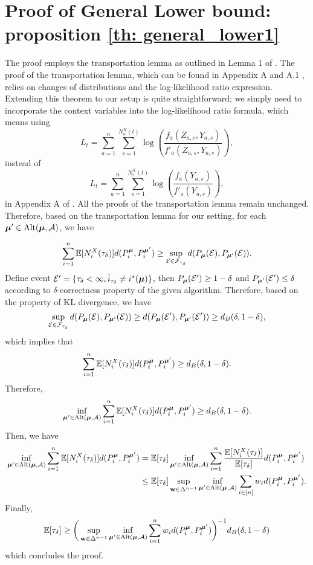 \section{Proof of General Lower bound: proposition \ref{th: general_lower1}} \label{apd: general bound}
    The proof employs the transportation lemma as outlined in Lemma 1 of \cite{kaufmann2016complexity}. The proof of the transportation lemma, which can be found in Appendix A and A.1 \cite{kaufmann2016complexity}, relies on changes of distributions and the log-likelihood ratio expression. Extending this theorem to our setup is quite straightforward; we simply need to incorporate the context variables into the log-likelihood ratio formula, which means using    
    $$
        L_t = \sum_{a = 1}^{n} \sum_{s = 1}^{N^{X}_a(t)} \log \left ( \frac{f_a(Z_{a,s}, Y_{a,s})}{f'_a(Z_{a,s}, Y_{a,s})} \right),
    $$
    instead of 
    $$
        L_t = \sum_{a = 1}^{n} \sum_{s = 1}^{N^{X}_i(t)} \log \left ( \frac{f_a(Y_{a,s})}{f'_a(Y_{a,s})} \right),
    $$
    in Appendix A of \cite{kaufmann2016complexity}. All the proofs of the transportation lemma remain unchanged. Therefore, based on the transportation lemma for our setting, for each $\boldsymbol{\mu}' \in \text{Alt}(\boldsymbol{\mu}, \mathcal{A})$, we have  

    $$
        \sum_{i = 1}^{n} \mathbb{E}[N^{X}_{i}(\tau_{\delta})] d(P^{\boldsymbol{\mu}}_{i}, P^{\boldsymbol{\mu}'}_{i}) \geq \sup_{\mathcal{E} \in \mathcal{F}_{\tau_{\delta}}} d (P_{\boldsymbol{\mu}}(\mathcal{E}), P_{\boldsymbol{\mu}'}(\mathcal{E})).
    $$
    Define event $\mathcal{E}' = \{\tau_{\delta} < \infty, \hat{i}_{\tau_{\delta}} \neq i^*(\boldsymbol{\mu})\}$, then $P_{\boldsymbol{\mu}}(\mathcal{E}') \geq 1 - \delta$ and  $P_{\boldsymbol{\mu}'}(\mathcal{E}') \leq \delta$ according to $\delta$-correctness property of the given algorithm. Therefore, based on the property of KL divergence, we have
    $$
        \sup_{\mathcal{E} \in \mathcal{F}_{\tau_{\delta}}} d (P_{\boldsymbol{\mu}}(\mathcal{E}), P_{\boldsymbol{\mu}'}(\mathcal{E})) \geq  d (P_{\boldsymbol{\mu}}(\mathcal{E}'), P_{\boldsymbol{\mu}'}(\mathcal{E}')) \geq d_{B} (\delta, 1 - \delta),
    $$
    which implies that
    $$
        \sum_{i = 1}^{n} \mathbb{E}[N^{X}_{i}(\tau_{\delta})] d(P^{\boldsymbol{\mu}}_{i}, P^{\boldsymbol{\mu}'}_{i}) \geq d_{B} (\delta, 1 - \delta).
    $$
    Therefore, 
    $$ 
       \inf_{\boldsymbol{\mu}' \in \text{Alt}(\boldsymbol{\mu}, \mathcal{A})} \sum_{i = 1}^{n} \mathbb{E}[N^{X}_{i}(\tau_{\delta})] d(P^{\boldsymbol{\mu}}_{i}, P^{\boldsymbol{\mu}'}_{i}) \geq d_{B} (\delta, 1 - \delta).
    $$
    Then, we have    
    \begin{align*}
        \inf_{\boldsymbol{\mu}' \in \text{Alt}(\boldsymbol{\mu}, \mathcal{A})} \sum_{i = 1}^{n} \mathbb{E}[N^{X}_{i}(\tau_{\delta})] d(P^{\boldsymbol{\mu}}_{i}, P^{\boldsymbol{\mu}'}_{i}) &= \mathbb{E}[\tau_{\delta}]  \inf_{\boldsymbol{\mu}' \in \text{Alt}(\boldsymbol{\mu}, \mathcal{A})} \sum_{i = 1}^{n} \frac{\mathbb{E}[N^{X}_{i}(\tau_{\delta})]}{\mathbb{E}[\tau_{\delta}]} d(P^{\boldsymbol{\mu}}_{i}, P^{\boldsymbol{\mu}'}_{i}) \\
              & \leq \mathbb{E}[\tau_{\delta}] \sup_{\mathbf{w} \in \Delta^{n-1}} \inf_{\boldsymbol{\mu}' \in \text{Alt}(\boldsymbol{\mu}, \mathcal{A})} \sum_{i \in [n]} w_i d(P^{\boldsymbol{\mu}}_{i}, P^{\boldsymbol{\mu}'}_{i}). 
    \end{align*}
    Finally,
    $$
        \mathbb{E}[\tau_{\delta}]    \geq \bigg ( \sup_{\mathbf{w} \in \Delta^{n-1}} \inf_{\boldsymbol{\mu}' \in \text{Alt}(\boldsymbol{\mu}, \mathcal{A})} \sum_{i = 1}^{n} w_i d(P^{\boldsymbol{\mu}}_{i}, P^{\boldsymbol{\mu}'}_{i}) \bigg )^{-1} d_{B} (\delta, 1 - \delta)  
    $$
    which concludes the proof.




